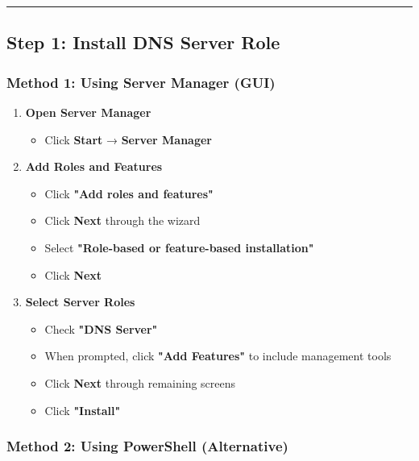 \begin{center}\rule{0.5\linewidth}{0.5pt}\end{center}

\subsection{Step 1: Install DNS Server Role}\label{step-1-install-dns-server-role}

\subsubsection{Method 1: Using Server Manager (GUI)}\label{method-1-using-server-manager-gui}

\begin{enumerate}
\def\labelenumi{\arabic{enumi}.}
\tightlist
\item
  \textbf{Open Server Manager}

  \begin{itemize}
  \tightlist
  \item
    Click \textbf{Start} → \textbf{Server Manager}
  \end{itemize}
\item
  \textbf{Add Roles and Features}

  \begin{itemize}
  \tightlist
  \item
    Click \textbf{"Add roles and features"}
  \item
    Click \textbf{Next} through the wizard
  \item
    Select \textbf{"Role-based or feature-based installation"}
  \item
    Click \textbf{Next}
  \end{itemize}
\item
  \textbf{Select Server Roles}

  \begin{itemize}
  \tightlist
  \item
    Check \textbf{"DNS Server"}
  \item
    When prompted, click \textbf{"Add Features"} to include management tools
  \item
    Click \textbf{Next} through remaining screens
  \item
    Click \textbf{"Install"}
  \end{itemize}
\end{enumerate}

\subsubsection{Method 2: Using PowerShell (Alternative)}\label{method-2-using-powershell-alternative}

